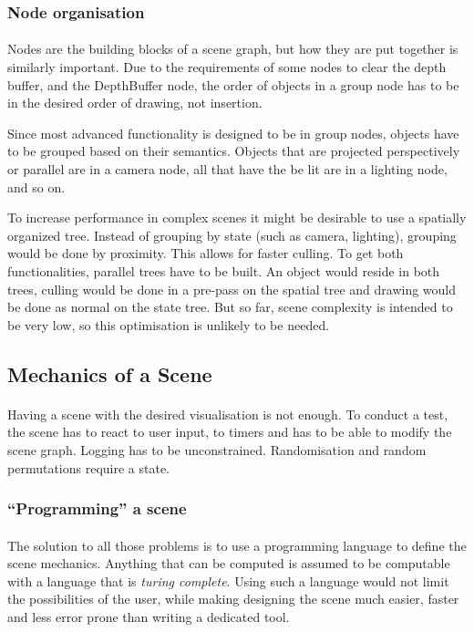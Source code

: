 \subsubsection{Node organisation}
\paragraph{}
Nodes are the building blocks of a scene graph, but how they are put together is similarly important. Due to the requirements of some nodes to clear the depth buffer, and the DepthBuffer node, the order of objects in a group node has to be in the desired order of drawing, not insertion.

Since most advanced functionality is designed to be in group nodes, objects have to be grouped based on their semantics.
Objects that are projected perspectively or parallel are in a camera node,
all that have the be lit are in a lighting node, and so on.

To increase performance in complex scenes it might be desirable to use a spatially organized tree. Instead of grouping by state (such as camera, lighting), grouping would be done by proximity.
This allows for faster culling.
To get both functionalities, parallel trees have to be built.
An object would reside in both trees, culling would be done in a pre-pass on the spatial tree and drawing would be done as normal on the state tree.
But so far, scene complexity is intended to be very low, so this optimisation is unlikely to be needed.


\subsection{Mechanics of a Scene\label{sceneMech}}
\paragraph{}
Having a scene with the desired visualisation is not enough. To conduct a test, the scene has to react to user input, to timers and has to be able to modify the scene graph. Logging has to be unconstrained. Randomisation and random permutations require a state.

\subsubsection{``Programming'' a scene}
\paragraph{}
The solution to all those problems is to use a programming language to define the scene mechanics. Anything that can be computed is assumed to be computable with a language that is \textit{turing complete}\cite{turing}. Using such a language would not limit the possibilities of the user, while making designing the scene much easier, faster and less error prone than writing a dedicated tool.

